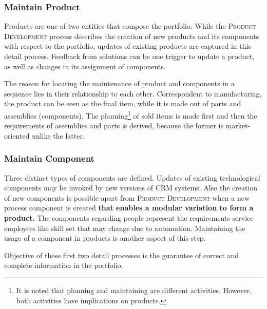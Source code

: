 	
	\subsubsection{Maintain Product}
	Products are one of two entities that compose the portfolio. While the \textsc{Product Development} process describes the creation of new products and its components with respect to the portfolio, updates of existing products are captured in this detail process. Feedback from solutions can be one trigger to update a product, as well as changes in its assignment of components. 
	
	The reason for locating the maintenance of product and components in a sequence lies in their relationship to each other. Correspondent to manufacturing, the product can be seen as the final item, while it is made out of parts and assemblies (components). The planning\footnote{It is noted that planning and maintaining are different activities. However, both activities have implications on products.} of sold items is made first and then the requirements of assemblies and parts is derived, because the former is market-oriented unlike the latter. 
	
	\subsubsection{Maintain Component}
	Three distinct types of components are defined. Updates of existing technological components may be invoked by new versions of \acrshort{CRM} systems. Also the creation of new components is possible apart from \textsc{Product Development }when a new process component is created \textbf{that enables a modular variation to form a product.} The components regarding people represent the requirements \wrt service employees like skill set that may change due to automation. Maintaining the usage of a component in products is another aspect of this step. 
	
	Objective of these first two detail processes is the guarantee of correct and complete information in the portfolio.
	
